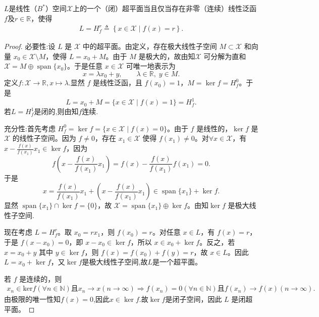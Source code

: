 \documentclass[../../main.tex]{subfiles}%
\begin{document}
\begin{theorem}\label{theorem:超平面是闭的当且仅当存在非零连续泛函}
$L$是线性（$B^*$）空间$\mathscr{X}$上的一个（闭）超平面当且仅当存在非零（连续）线性泛函$f$及$r \in \mathbb{R}$，使得
\begin{align*}
L=H_{f}^{r}\triangleq \left\{ x\in \mathscr{X} \mid f\left( x \right) =r \right\} .
\end{align*}
\end{theorem}
\begin{proof}

{\heiti 必要性:}设 $L$ 是 $\mathscr{X}$ 中的超平面。由定义，存在极大线性子空间 $M\subset\mathscr{X}$ 和向量 $x_0\in\mathscr{X}\setminus M$，使得 $L = x_0 + M$。由于 $M$ 是极大的，故由知$\mathscr{X}$ 可分解为直和 $\mathscr{X} = M \oplus \operatorname{span}\{x_0\}$。于是任意 $x\in\mathscr{X}$ 可唯一地表示为
\[
x = \lambda x_0 + y, \qquad \lambda\in\mathbb{R},\; y\in M.
\]
定义$f:\mathscr{X}\to\mathbb{R},x\mapsto \lambda$.显然 $f$ 是线性泛函，且 $f(x_0)=1$，$M = \ker f = H_f^0$。于是
\[
L = x_0 + M = \{x\in\mathscr{X}\mid f(x)=1\} = H_f^1.
\]
若$L=H_f^1$是闭的,则由知$f$连续.

{\heiti 充分性:}首先考虑 $H_f^0 = \ker f = \{ x \in \mathscr{X} \mid f(x) = 0 \}$。由于 $f$ 是线性的，$\ker f$ 是 $\mathscr{X}$ 的线性子空间。因为 $f \neq 0$，存在 $x_1 \in \mathscr{X}$ 使得 $f(x_1) \neq 0$。对$\forall x \in \mathscr{X}$，有$x - \frac{f(x)}{f(x_1)} x_1 \in \ker f$，因为
\[
f(x - \frac{f(x)}{f(x_1)} x_1) = f(x) - \frac{f(x)}{f(x_1)} f(x_1) = 0.
\]
于是
\[
x = \frac{f(x)}{f(x_1)} x_1 + (x - \frac{f(x)}{f(x_1)} x_1) \in \operatorname{span}\{x_1\} + \ker f.
\]
显然 $\operatorname{span}\{x_1\} \cap \ker f = \{0\}$，故 $\mathscr{X} = \operatorname{span}\{x_1\} \oplus \ker f$。由知$\ker f$ 是极大线性子空间.

现在考虑 $L = H_f^r$。取 $x_0 = r x_1$，则 $f(x_0) = r$。对任意 $x \in L$，有 $f(x) = r$，于是 $f(x - x_0) = 0$，即 $x - x_0 \in \ker f$，所以 $x \in x_0 + \ker f$。反之，若 $x = x_0 + y$ 其中 $y \in \ker f$，则 $f(x) = f(x_0) + f(y) = r$，故 $x \in L$。因此 $L = x_0 + \ker f$，又$\ker f$是极大线性子空间,故$L$是一个超平面。

若 $f$ 是连续的，则
\begin{align*}
x_n\in \mathrm{ker}f\left( \forall n\in \mathbb{N} \right) \text{且}x_n\rightarrow x\left( n\rightarrow \infty \right) \Longrightarrow f\left( x_n \right) =0\left( \forall n\in \mathbb{N} \right) \text{且}f\left( x_n \right) \rightarrow f\left( x \right) \left( n\rightarrow \infty \right) .
\end{align*}
由极限的唯一性知$f(x)=0$,因此$x\in \ker f$.故$\ker f$是闭子空间，因此 $L$ 是闭超平面。

\end{proof}
\end{document}
